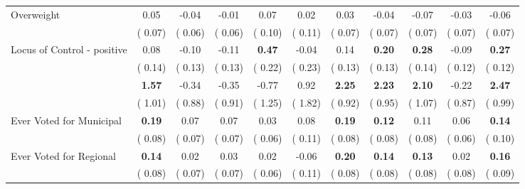 \begin{tabular}{l c c c c c c c c c c}
Overweight &      0.05 &     -0.04 &     -0.01 &      0.07 &      0.02 &      0.03 &     -0.04 &     -0.07 &     -0.03 &     -0.06 \\
& (     0.07) & (     0.06) & (     0.06) & (     0.10) & (     0.11) & (     0.07) & (     0.07) & (     0.07) & (     0.07) & (     0.07) \\
Locus of Control - positive &      0.08 &     -0.10 &     -0.11 & \textbf{      0.47 } &     -0.04 &      0.14 & \textbf{      0.20 } & \textbf{      0.28 } &     -0.09 & \textbf{     0.27} \\
& (     0.14) & (     0.13) & (     0.13) & (     0.22) & (     0.23) & (     0.13) & (     0.13) & (     0.14) & (     0.12) & (     0.12) \\
& \textbf{      1.57 } &     -0.34 &     -0.35 &     -0.77 &      0.92 & \textbf{      2.25 } & \textbf{      2.23 } & \textbf{      2.10 } &     -0.22 & \textbf{     2.47} \\
& (     1.01) & (     0.88) & (     0.91) & (     1.25) & (     1.82) & (     0.92) & (     0.95) & (     1.07) & (     0.87) & (     0.99) \\
Ever Voted for Municipal & \textbf{      0.19 } &      0.07 &      0.07 &      0.03 &      0.08 & \textbf{      0.19 } & \textbf{      0.12 } &      0.11 &      0.06 & \textbf{     0.14} \\
& (     0.08) & (     0.07) & (     0.07) & (     0.06) & (     0.11) & (     0.08) & (     0.08) & (     0.08) & (     0.06) & (     0.10) \\
Ever Voted for Regional & \textbf{      0.14 } &      0.02 &      0.03 &      0.02 &     -0.06 & \textbf{      0.20 } & \textbf{      0.14 } & \textbf{      0.13 } &      0.02 & \textbf{     0.16} \\
& (     0.08) & (     0.07) & (     0.07) & (     0.06) & (     0.11) & (     0.08) & (     0.08) & (     0.08) & (     0.08) & (     0.09) \\
\bottomrule
\end{tabular}
